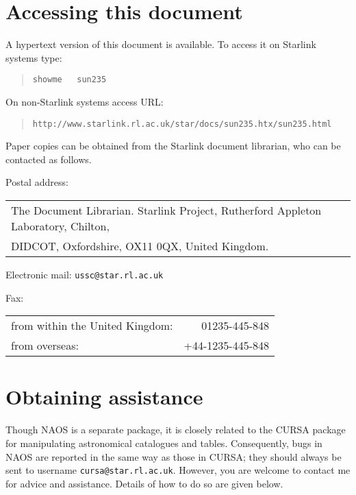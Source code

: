 \documentclass[twoside,11pt]{article}
\newcommand{\htmladdnormallink}[2]{#1}
\renewcommand{\_}{\texttt{\symbol{95}}}
\begin{document}
\newpage
\section*{Accessing this document}

A hypertext version of this document is available.  To access it on
Starlink systems type:

\begin{quote}
{\tt showme ~ sun235}
\end{quote}

On non-Starlink systems access URL:

\begin{quote}
\htmladdnormallink{
{\tt http://www.starlink.rl.ac.uk/star/docs/sun235.htx/sun235.html}}
{http://www.starlink.rl.ac.uk/star/docs/sun235.htx/sun235.html}
\end{quote}

Paper copies can be obtained from the Starlink document librarian,
who can be contacted as follows.

Postal address: \\
\begin{tabular}{l}
The Document Librarian. Starlink Project, Rutherford Appleton Laboratory, 
  Chilton, \\
DIDCOT, Oxfordshire, OX11 0QX, United Kingdom.                \\
\end{tabular}


Electronic mail: {\tt ussc@star.rl.ac.uk}



Fax: \\
\begin{tabular}{lr}
from within the United Kingdom: &    01235-445-848 \\
from overseas:                  & +44-1235-445-848 \\
\end{tabular}


\section*{Obtaining assistance}

Though NAOS is a separate package, it is closely related to the CURSA
package for manipulating astronomical catalogues and tables.  Consequently,
bugs in NAOS are reported in the same way as those in CURSA; they should
always be sent to username {\tt cursa@star.rl.ac.uk}.  However, you are
welcome to contact me for advice and assistance.  Details of how to do so
are given below.
\end{document}
